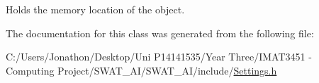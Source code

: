 Holds the memory location of the object. 



The documentation for this class was generated from the following file\+:\begin{DoxyCompactItemize}
\item 
C\+:/\+Users/\+Jonathon/\+Desktop/\+Uni P14141535/\+Year Three/\+I\+M\+A\+T3451 -\/ Computing Project/\+S\+W\+A\+T\+\_\+\+A\+I/\+S\+W\+A\+T\+\_\+\+A\+I/include/\hyperlink{_settings_8h}{Settings.\+h}\end{DoxyCompactItemize}
